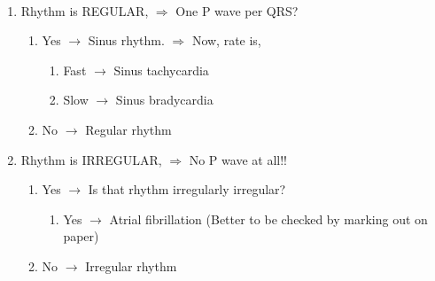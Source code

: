 \documentclass[11pt,a4paper]{report}
\begin{document}
~\\
\begin{enumerate}
	\item Rhythm is REGULAR, $\Rightarrow$ One P wave per QRS? 
	\begin{enumerate}
		\item Yes $\rightarrow$ Sinus rhythm. $\Rightarrow$ Now, rate is, 
		\begin{enumerate}
			\item Fast $\rightarrow$ Sinus tachycardia 
			\item Slow $\rightarrow$ Sinus bradycardia 
		\end{enumerate}
		\item No $\rightarrow$ Regular rhythm
	\end{enumerate}
	\item Rhythm is IRREGULAR, $\Rightarrow$ No P wave at all!!
	\begin{enumerate}
		\item Yes $\rightarrow$ Is that rhythm irregularly irregular? 
		\begin{enumerate}
			\item Yes $\rightarrow$ Atrial fibrillation (Better to be checked by marking out on paper)
		\end{enumerate} 
		\item No $\rightarrow$ Irregular rhythm
	\end{enumerate}
\end{enumerate}
\end{document}

